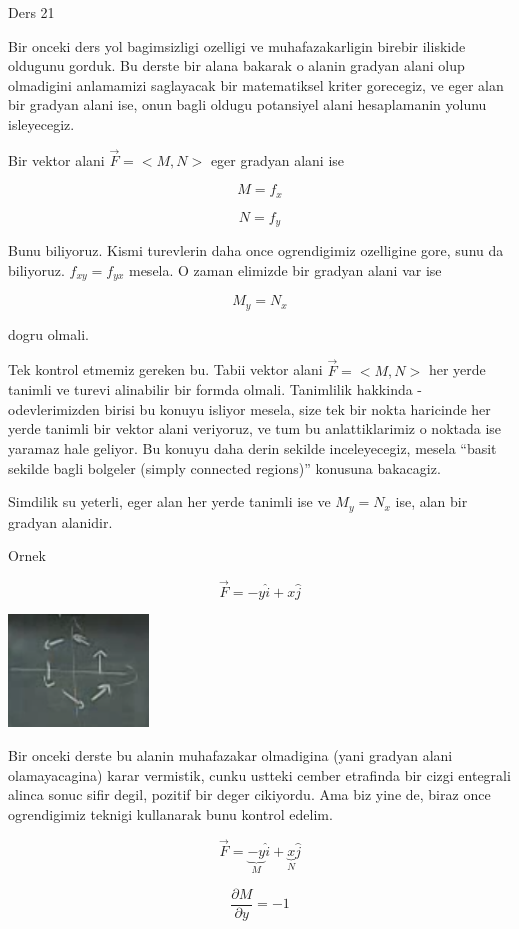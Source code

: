 \documentclass[12pt,fleqn]{article}\usepackage{../common}
\begin{document}
Ders 21

Bir onceki ders yol bagimsizligi ozelligi ve muhafazakarligin birebir
iliskide oldugunu gorduk. Bu derste bir alana bakarak o alanin gradyan
alani olup olmadigini anlamamizi saglayacak bir matematiksel kriter
gorecegiz, ve eger alan bir gradyan alani ise, onun bagli oldugu potansiyel
alani hesaplamanin yolunu isleyecegiz. 

Bir vektor alani $\vec{F} = <M,N>$ eger gradyan alani ise 

\[ M = f_x \]

\[ N = f_y \]

Bunu biliyoruz. Kismi turevlerin daha once ogrendigimiz ozelligine
gore, sunu da biliyoruz. $f_{xy} = f_{yx}$ mesela. O zaman elimizde bir
gradyan alani var ise

\[ M_y = N_x \]

dogru olmali. 

Tek kontrol etmemiz gereken bu. Tabii vektor alani $\vec{F} = <M,N>$ her
yerde tanimli ve turevi alinabilir bir formda olmali. Tanimlilik hakkinda -
odevlerimizden birisi bu konuyu isliyor mesela, size tek bir nokta
haricinde her yerde tanimli bir vektor alani veriyoruz, ve tum bu
anlattiklarimiz o noktada ise yaramaz hale geliyor. Bu konuyu daha derin
sekilde inceleyecegiz, mesela ``basit sekilde bagli bolgeler (simply
connected regions)'' konusuna bakacagiz. 

Simdilik su yeterli, eger alan her yerde tanimli ise ve $M_y = N_x$ ise,
alan bir gradyan alanidir. 

Ornek 

\[ \vec{F} = -y\hat{i} + x\hat{j} \]

\includegraphics[height=3cm]{21_1.png}

Bir onceki derste bu alanin muhafazakar olmadigina (yani gradyan alani
olamayacagina) karar vermistik, cunku ustteki cember etrafinda bir cizgi
entegrali alinca sonuc sifir degil, pozitif bir deger cikiyordu. Ama biz
yine de, biraz once ogrendigimiz teknigi kullanarak bunu kontrol edelim.

\[ \vec{F} = \underbrace{-y}_{M}\hat{i} + 
\underbrace{x}_{N}\hat{j} 
\]

\[ \frac{\partial M}{\partial y} = -1 \]
\end{document}
